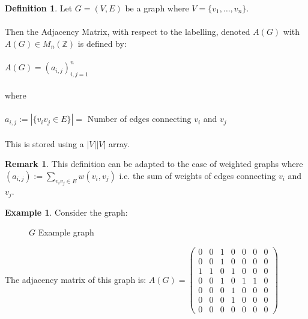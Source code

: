 \documentclass[11pt,reqno]{amsart}
\theoremstyle{definition}
\newtheorem{definition}{Definition}
\newtheorem{remark}[thm]{Remark}
\newtheorem{example}[thm]{Example}
\numberwithin{equation}{section}
\begin{document}
\begin{definition}
	Let $G=(V,E)$ be a graph where $V=\{v_1,\dots,v_n\}$.\\
	\\
	Then the Adjacency Matrix, with respect to the labelling, denoted $A(G)$ with $ A(G) \in M_n(\mathbb{Z})$ is defined by:\\
	\\
	$A(G)=(a_{i,j})_{i,j = 1}^{n}$\\
	\\
	where\\
	\\
	$a_{i,j} := | \{v_{i}v_{j} \in E\}| =$ Number of edges connecting $v_{i}$ and $v_{j}$\\
	\\
	\noindent This is stored using a $|V||V|$ array.
\end{definition}

\begin{remark}
	This definition can be adapted to the case of weighted graphs where\\ $(a_{i,j}):= \sum\limits_{v_iv_j \in E} w(v_i,v_j)$ i.e. the sum of weights of edges connecting $v_i$ and $v_j$.
\end{remark}

\begin{example}
	Consider the graph:
		\begin{figure}[h!]
		\caption{$G$ Example graph}
		\label{fig:ForestV9}
	\end{figure}
	
The adjacency matrix of this graph is:
\begin{math}
A(G) = 
\begin{pmatrix}
		0 & 
		0 & 
		1 & 
		0 & 
		0 & 
		0 & 
		0
		\\ 
		0& 
		 0&  
		 1& 
		 0& 
		 0& 
		 0& 
		 0 
		 \\
		 1 & 
		 1  &  
		 0 & 
		 1 & 
		 0 & 
		 0& 
		 0 
		 \\
		 0& 
		 0 &  
		 1& 
		 0& 
		 1& 
		 1& 
		 0 
		 \\
		 0& 
		 0&  
		 0& 
		 1& 
		 0& 
		 0& 
		 0 
		 \\
		 0& 
		 0&  
		 0& 
		 1& 
		 0& 
		 0& 
		 0 
		 \\
		 0& 
		 0 &  
		 0& 
		 0& 
		 0& 
		 0& 
		 0 
	\end{pmatrix} 
\end{math}
\end{example}
\end{document}
